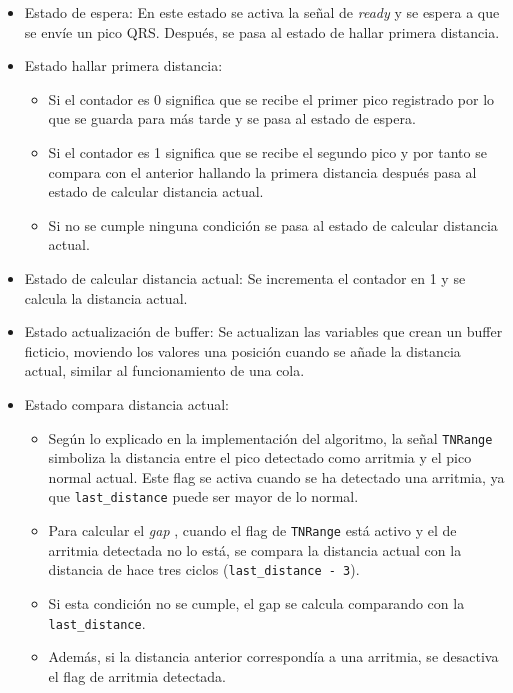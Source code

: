 \begin{itemize}
    \item Estado de espera: En este estado se activa la señal de \textit{ready} y se espera a que se envíe un pico QRS. Después, se pasa al estado de hallar primera distancia.
    \item Estado hallar primera distancia: 
    \begin{itemize}
        \item Si el contador es 0 significa que se recibe el primer pico registrado por lo que se guarda para más tarde y se pasa al estado de espera.
        \item Si el contador es 1 significa que se recibe el segundo pico y por tanto se compara con el anterior hallando la primera distancia después pasa al estado de calcular distancia actual.
        \item Si no se cumple ninguna condición se pasa al estado de calcular distancia actual.   
    \end{itemize}
    \item Estado de calcular distancia actual: Se incrementa el contador en 1 y se calcula la distancia actual.
    \item Estado actualización de buffer: Se actualizan las variables que crean un buffer ficticio, moviendo los valores una posición cuando se añade la distancia actual, similar al funcionamiento de una cola.
    \item Estado compara distancia actual: 
    \begin{itemize}
        \item Según lo explicado en la implementación del algoritmo, la señal \texttt{TNRange} simboliza la distancia entre el pico detectado como arritmia y el pico normal actual. Este flag se activa cuando se ha detectado una arritmia, ya que \texttt{last\_distance} puede ser mayor de lo normal.
        \item Para calcular el  \textit{gap} , cuando el flag de \texttt{TNRange} está activo y el de arritmia detectada no lo está, se compara la distancia actual con la distancia de hace tres ciclos (\texttt{last\_distance - 3}).
        \item Si esta condición no se cumple, el gap se calcula comparando con la \texttt{last\_distance}.
        \item Además, si la distancia anterior correspondía a una arritmia, se desactiva el flag de arritmia detectada.
    \end{itemize}


\end{itemize}
